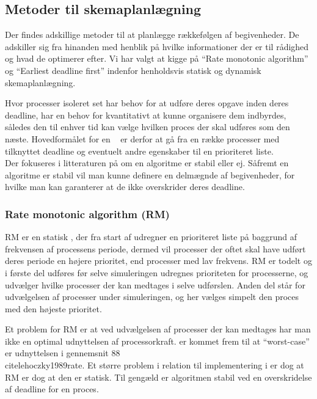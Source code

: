 \subsection{Metoder til skemaplanlægning}
Der findes adskillige metoder til at planlægge rækkefølgen af begivenheder. De adskiller sig fra hinanden med henblik på hvilke informationer der er til rådighed og hvad de optimerer efter. Vi har valgt at kigge på ``Rate monotonic algorithm''\cite{lehoczky1989rate,liu1973scheduling} og ``Earliest deadline first''\cite{liu1973scheduling} indenfor henholdsvis statisk og dynamisk skemaplanlægning.

Hvor processer isoleret set har behov for at udføre deres opgave inden deres deadline, har \sched en behov for kvantitativt at kunne organisere dem indbyrdes, således den til enhver tid kan vælge hvilken proces der skal udføres som den næste. Hovedformålet for en  \sched ~ er derfor at gå fra en række processer med tilknyttet deadline og eventuelt andre egenskaber til en prioriteret liste. \\
Der fokuseres i litteraturen på om en algoritme er stabil eller ej. Såfremt en algoritme er stabil vil man kunne definere en delmægnde af begivenheder, for hvilke man kan garanterer at de ikke overskrider deres deadline. 

\subsubsection{Rate monotonic algorithm (RM)}
RM er en statisk \sched, der fra start af udregner en prioriteret liste på baggrund af frekvensen af processens periode, dermed vil processer der oftet skal have udført deres periode en højere prioritet, end processer med lav frekvens. RM er todelt og i første del udføres før selve simuleringen udregnes  prioriteten for processerne, og udvælger hvilke processer der kan medtages i selve udførslen. Anden del står for udvælgelsen af processer  under simuleringen, og her vælges simpelt den proces med den højeste prioritet. 

Et problem for RM er at ved udvælgelsen af processer der kan medtages har man ikke en optimal udnyttelsen af processorkraft.  er kommet frem til at ``worst-case'' er udnyttelsen i gennemsnit 88\\cite{lehoczky1989rate}. Et større problem i relation til implementering i \pycsp er dog at RM er dog at den er statisk. Til gengæld er algoritmen stabil ved en overskridelse af deadline for en proces. 

